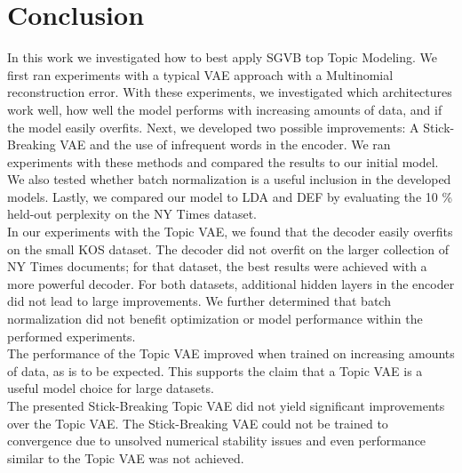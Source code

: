 \documentclass{report}
\begin{document}
	




		
\chapter{Conclusion}


In this work we investigated how to best apply SGVB top Topic Modeling. We first ran experiments with a typical VAE approach with a Multinomial reconstruction error. With these experiments, we investigated which architectures work well, how well the model performs with increasing amounts of data, and if the model easily overfits. Next, we developed two possible improvements: A Stick-Breaking VAE and the use of infrequent words in the encoder. We ran experiments with these methods and compared the results to our initial model. We also tested whether batch normalization is a useful inclusion in the developed models. Lastly, we compared our model to LDA and DEF by evaluating the 10 \% held-out perplexity on the NY Times dataset.\\
In our experiments with the Topic VAE, we found that the decoder easily overfits on the small KOS dataset. The decoder did not overfit on the larger collection of NY Times documents; for that dataset, the best results were achieved with a more powerful decoder. For both datasets, additional hidden layers in the encoder did not lead to large improvements. We further determined that batch normalization did not benefit optimization or model performance within the performed experiments. \\
The performance of the Topic VAE improved when trained on increasing amounts of data, as is to be expected. This supports the claim that a Topic VAE is a useful model choice for large datasets.\\
The presented Stick-Breaking Topic VAE did not yield significant improvements over the Topic VAE. The Stick-Breaking VAE could not be trained to convergence due to unsolved numerical stability issues and even  performance similar to the Topic VAE was not achieved. \\
\end{document}
